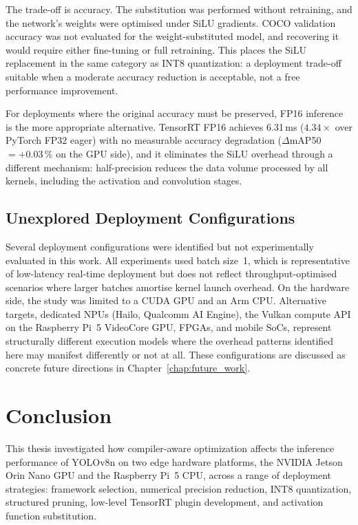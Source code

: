 \documentclass[12pt,a4paper]{report}
\begin{document}
The trade-off is accuracy.
The substitution was performed without retraining, and the network's weights were optimised under SiLU gradients.
COCO validation accuracy was not evaluated for the weight-substituted model, and recovering it would require either
fine-tuning or full retraining.
This places the SiLU replacement in the same category as INT8 quantization: a deployment trade-off suitable when a
moderate accuracy reduction is acceptable, not a free performance improvement.

For deployments where the original accuracy must be preserved, FP16 inference is the more appropriate alternative.
TensorRT FP16 achieves 6.31\,ms ($4.34\times$ over PyTorch FP32 eager) with no measurable accuracy degradation
($\Delta$mAP50 $= +0.03\,\%$ on the GPU side), and it eliminates the SiLU overhead through a different mechanism:
half-precision reduces the data volume processed by all kernels, including the activation and convolution stages.

\section{Unexplored Deployment Configurations}

Several deployment configurations were identified but not experimentally evaluated in this work.
All experiments used batch size~1, which is representative of low-latency real-time deployment but does not reflect
throughput-optimised scenarios where larger batches amortise kernel launch overhead.
On the hardware side, the study was limited to a CUDA GPU and an Arm CPU.
Alternative targets, dedicated NPUs (Hailo, Qualcomm AI Engine), the Vulkan compute API on the Raspberry Pi~5 VideoCore
GPU, FPGAs, and mobile SoCs, represent structurally different execution models where the overhead patterns identified
here may manifest differently or not at all.
These configurations are discussed as concrete future directions in Chapter~\ref{chap:future_work}.


\chapter{Conclusion}

This thesis investigated how compiler-aware optimization affects the inference performance of YOLOv8n on two edge
hardware platforms, the NVIDIA Jetson Orin Nano GPU and the Raspberry Pi~5 CPU, across a range of deployment strategies:
framework selection, numerical precision reduction, INT8 quantization, structured pruning, low-level TensorRT plugin
development, and activation function substitution.
\end{document}

